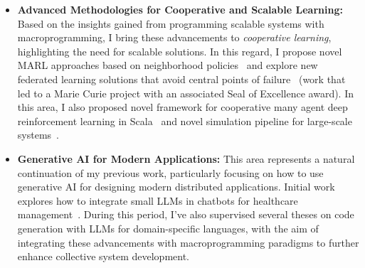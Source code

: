 \documentclass[10pt,a4paper,roman]{moderncv}        %
\begin{document}
{\begin{itemize}
  I integrate machine learning solutions to improve currently manual design approaches. 
  The goal is to both enhance system adaptability (through learning) 
  and improve overall efficiency. 
  This integration was first outlined through comprehensive roadmaps~\cite{aguzzi2022machine,aguzzi2021research}, 
  then implemented in several ways: 
  leveraging Multi-Agent Reinforcement Learning (MARL) for program synthesis~\cite{aguzzi2022towards}, 
  improving macroprogramming execution with scheduling learned via MARL~\cite{aguzzi2022addressing}, 
  and enhancing current MARL solutions for swarms by using macroprogramming as a way to represent agent state~\cite{aguzzi2023field}.
  \item \textbf{Advanced Methodologies for Cooperative and Scalable Learning:} 
  Based on the insights gained from programming scalable systems with macroprogramming, 
  I bring these advancements to \emph{cooperative learning}, 
  highlighting the need for scalable solutions. 
  In this regard, 
  I propose novel MARL approaches based on neighborhood policies~\cite{DBLP:conf/sac/MalucelliDAV25} 
  and explore new federated learning solutions that avoid central points of failure~\cite{domini2024field,domini2024proximity} (work that led to a Marie Curie project with an associated Seal of Excellence award).
  In this area, I also proposed novel framework for cooperative many agent deep reinforcement learning in Scala~\cite{domini2023scarlib} and novel simulation pipeline for large-scale systems~\cite{DBLP:conf/dsrt/DominiAPV24}.
  \item \textbf{Generative AI for Modern Applications:} 
  This area represents a natural continuation of my previous work, 
  particularly focusing on how to use generative AI for designing modern distributed applications.
   Initial work explores how to integrate small LLMs in chatbots for healthcare management~\cite{tschope2025novel,magnini2025open}. During this period, I've also supervised several theses on code generation with LLMs for domain-specific languages, 
   with the aim of integrating these advancements with macroprogramming paradigms to further enhance collective system development.
\end{itemize}
}
\end{document}
